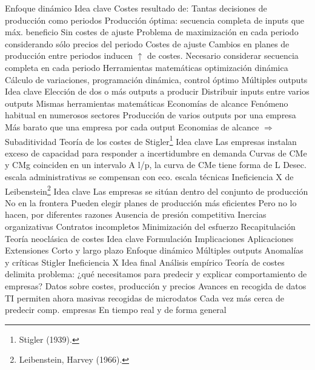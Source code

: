 \documentclass{nuevotema}
\begin{document}
\begin{esquemal}
				\4 
		\2 Enfoque dinámico
			\3 Idea clave
				\4 Costes resultado de:
				\4[] Tantas decisiones de producción como periodos
				\4 Producción óptima:
				\4 secuencia completa de inputs que máx. beneficio
			\3 Sin costes de ajuste
				\4 Problema de maximización en cada periodo
				\4[] considerando sólo precios del periodo
			\3 Costes de ajuste
				\4 Cambios en planes de producción entre periodos
				\4[] inducen $\uparrow$ de costes.
				\4 Necesario considerar secuencia completa en cada periodo
				\4[$\to$] Herramientas matemáticas optimización dinámica
				\4[] Cálculo de variaciones, programación dinámica, control óptimo
		\2 Múltiples outputs
			\3 Idea clave
				\4 Elección de dos o más outputs a producir
				\4[$\to$] Distribuir inputs entre varios outputs
				\4 Mismas herramientas matemáticas
			\3 Economías de alcance
				\4 Fenómeno habitual en numerosos sectores
				\4 Producción de varios outputs por una empresa
				\4[$\to$] Más barato que una empresa por cada output
				\4 Economias de alcance $\Rightarrow$ Subaditividad
	\1 
		\2 Teoría de los costes de Stigler\footnote{Stigler (1939).}
			\3 Idea clave
				\4 Las empresas instalan exceso de capacidad
				\4[] para responder a incertidumbre en demanda
				\4[$\to$]Curvas de CMe y CMg coinciden en un intervalo
				\4 
				\4 A l/p, la curva de CMe tiene forma de L
				\4[$\to$] Desec. escala administrativas se compensan con eco. escala técnicas
		\2 Ineficiencia X de Leibenstein\footnote{Leibenstein, Harvey (1966).}
			\3 Idea clave
				\4 Las empresas se sitúan dentro del conjunto de producción
				\4[$\to$] No en la frontera
				\4 Pueden elegir planes de producción más eficientes
				\4[$\to$] Pero no lo hacen, por diferentes razones
				\4[i] Ausencia de presión competitiva
				\4[ii] Inercias organizativas
				\4[iii] Contratos incompletos
				\4[iv] Minimización del esfuerzo
	\1[] 
		\2 Recapitulación
			\3 Teoría neoclásica de costes
				\4 Idea clave
				\4 Formulación
				\4 Implicaciones
				\4 Aplicaciones
			\3 Extensiones
				\4 Corto y largo plazo
				\4 Enfoque dinámico
				\4 Múltiples outputs
			\3 Anomalías y críticas
				\4 Stigler
				\4 Ineficiencia X
		\2 Idea final
			\3 Análisis empírico
				\4 Teoría de costes delimita problema:
				\4[] ¿qué necesitamos para predecir y explicar comportamiento de empresas?
				\4[$\to$] Datos sobre costes, producción y precios
			\3 Avances en recogida de datos
				\4 TI permiten ahora masivas recogidas de microdatos
				\4 Cada vez más cerca de predecir comp. empresas
				\4[] En tiempo real y de forma general
\end{esquemal}
\end{document}
